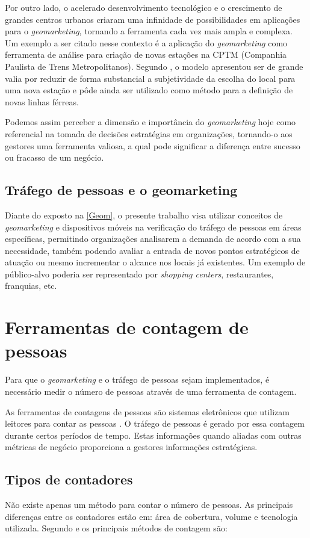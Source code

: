 Por outro lado, o acelerado desenvolvimento tecnológico e o crescimento de
grandes centros urbanos criaram uma infinidade de possibilidades em aplicações
para o \emph{geomarketing}, tornando a ferramenta cada vez mais ampla e
complexa. Um exemplo a ser citado nesse contexto é a aplicação do
\emph{geomarketing} como ferramenta de análise para criação de novas estações na
CPTM (Companhia Paulista de Trens Metropolitanos). Segundo
, o modelo apresentou ser de grande valia por reduzir de
forma substancial a subjetividade da escolha do local para uma nova estação e
pôde ainda ser utilizado como método para a definição de novas linhas férreas.

Podemos assim perceber a dimensão e importância do \emph{geomarketing} hoje como
referencial na tomada de decisões estratégias em organizações,
tornando-o aos gestores uma ferramenta valiosa, a qual pode significar a
diferença entre sucesso ou fracasso de um negócio.

\subsection{Tráfego de pessoas e o geomarketing}
Diante do exposto na \autoref{Geom}, o presente trabalho
visa utilizar conceitos de \emph{geomarketing} e dispositivos móveis na
verificação do tráfego de pessoas em áreas específicas, permitindo organizações analisarem a
demanda de acordo com a sua necessidade, também podendo avaliar a entrada
de novos pontos estratégicos de atuação ou mesmo incrementar o alcance nos
locais já existentes. Um exemplo de público-alvo poderia ser representado por
\emph{shopping centers}, restaurantes, franquias, etc.

\section{Ferramentas de contagem de pessoas}
Para que o \emph{geomarketing} e o tráfego de pessoas sejam implementados, é necessário medir o número
de pessoas através de uma ferramenta de contagem.

As ferramentas de contagens de pessoas
são sistemas eletrônicos que utilizam leitores para contar as pessoas
\cite{trafsysdef}. O tráfego de pessoas é gerado por essa contagem durante
certos períodos de tempo. Estas informações quando aliadas com outras métricas de
negócio proporciona a gestores informações estratégicas.

\subsection{Tipos de contadores}
Não existe apenas um método para contar o número de pessoas. As principais
diferenças entre os contadores estão em: área de cobertura, volume e tecnologia
utilizada. Segundo  e  os principais métodos de
contagem são:

